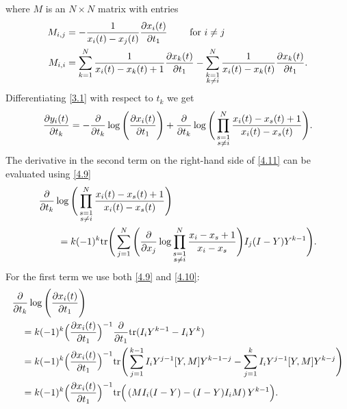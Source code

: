\documentclass[11pt,reqno]{amsart}
\theoremstyle{definition}
\numberwithin{equation}{section}
\begin{document}
where $M$ is an $N\times N$ matrix with entries
\begin{equation*}
\begin{split}
M_{i,j}& =-\frac{1}{x_i(t)-x_j(t)}\frac{\partial x_i(t)}{\partial t_1} \qquad
\text{ for }i\neq j\\
M_{i,i}& =\sum_{k=1}^N\frac{1}{x_i(t)-x_k(t)+1}\frac{\partial x_k(t)}{\partial t_1}
-\sum_{\begin{subarray}{c}k=1 \\k\neq i\end{subarray}}^N
\frac{1}{x_i(t)-x_k(t)}\frac{\partial x_k(t)}{\partial t_1}.
\end{split}
\end{equation*}
Differentiating \eqref{3.1} with respect to $t_k$ we get
\begin{equation}\label{4.11}
\frac{\partial y_i(t)}{\partial t_k} = 
-\frac{\partial }{\partial t_k} \log\Bigg(\frac{\partial x_i(t)}{\partial t_1}\Bigg)
+\frac{\partial}{\partial t_k}\log\Bigg(
\prod_{\begin{subarray}{c}s=1 \\s\neq i\end{subarray}}^N
\frac{x_i(t)-x_s(t)+1}{x_i(t)-x_s(t)}\Bigg).
\end{equation}
The derivative in the second term on the right-hand side of \eqref{4.11} can 
be evaluated using \eqref{4.9}
\begin{align*}
&\frac{\partial}{\partial t_k}\log\Bigg(
\prod_{\begin{subarray}{c}s=1 \\s\neq i\end{subarray}}^N
\frac{x_i(t)-x_s(t)+1}{x_i(t)-x_s(t)}\Bigg)\\ 
&\qquad =
k(-1)^k\mathrm{tr}\Bigg(\sum_{j=1}^N\Bigg(\frac{\partial}{\partial x_j}\log
\prod_{\begin{subarray}{c}s=1 \\s\neq i\end{subarray}}^N
\frac{x_i-x_s+1}{x_i-x_s}\Bigg)I_j(I-Y)Y^{k-1}\Bigg).
\end{align*}
For the first term we use both \eqref{4.9} and \eqref{4.10}:
\begin{align*}
&\frac{\partial }{\partial t_k} \log\Bigg(\frac{\partial x_i(t)}{\partial t_1}\Bigg) \\
&\quad = k(-1)^k\Big(\frac{\partial x_i(t)}{\partial t_1}\Big)^{-1}\frac{\partial }{\partial t_1}
\mathrm{tr}(I_iY^{k-1}-I_iY^{k})\\
&\quad = k(-1)^k\Big(\frac{\partial x_i(t)}{\partial t_1}\Big)^{-1}
\mathrm{tr}\Bigg(\sum_{j=1}^{k-1}I_iY^{j-1}[Y,M]Y^{k-1-j}
-\sum_{j=1}^{k}I_iY^{j-1}[Y,M]Y^{k-j}\Bigg)\\
&\quad = k(-1)^k\Big(\frac{\partial x_i(t)}{\partial t_1}\Big)^{-1}
\mathrm{tr}\Big(\left(MI_i(I-Y)-(I-Y)I_iM\right)Y^{k-1}\Big).
\end{align*}
\end{document}
